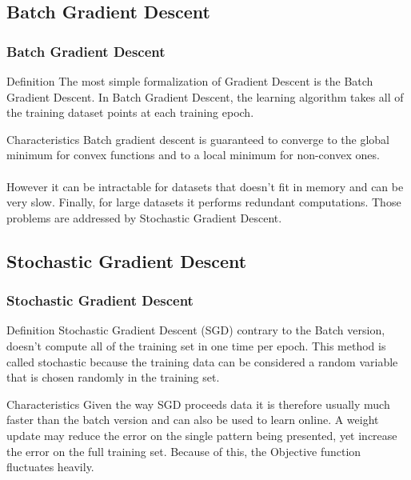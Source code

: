 \documentclass{beamer}
\begin{document}
\subsection{Batch Gradient Descent}
\begin{frame}
\frametitle{Batch Gradient Descent}

\begin{block}{Definition}
The most simple formalization of Gradient Descent is the Batch Gradient Descent.
In Batch Gradient Descent, the learning algorithm takes all of the training dataset points at each training epoch.
\end{block}

\begin{block}{Characteristics}
Batch gradient descent is guaranteed to converge to the global minimum for convex functions and to a local minimum for non-convex ones.\\~\\

However it can be intractable for datasets that doesn't fit in memory and can be very slow. Finally, for large datasets it performs redundant computations. Those problems are addressed by Stochastic Gradient Descent.
\end{block}

\end{frame}







\subsection{Stochastic Gradient Descent}
\begin{frame}
\frametitle{Stochastic Gradient Descent}

\begin{block}{Definition}
Stochastic Gradient Descent (SGD) contrary to the Batch version, doesn't compute all of the training set in one time per epoch. This method is called stochastic because the training data can be considered a random variable that is chosen randomly in the training set.
\end{block}

\begin{block}{Characteristics}
Given the way SGD proceeds data it is therefore usually much faster than the batch version and can also be used to learn online.
A weight update may reduce the error on the single pattern being presented, yet increase the error on the full training set. Because of this, the Objective function fluctuates heavily.
\end{block}

\end{frame}
\end{document}
